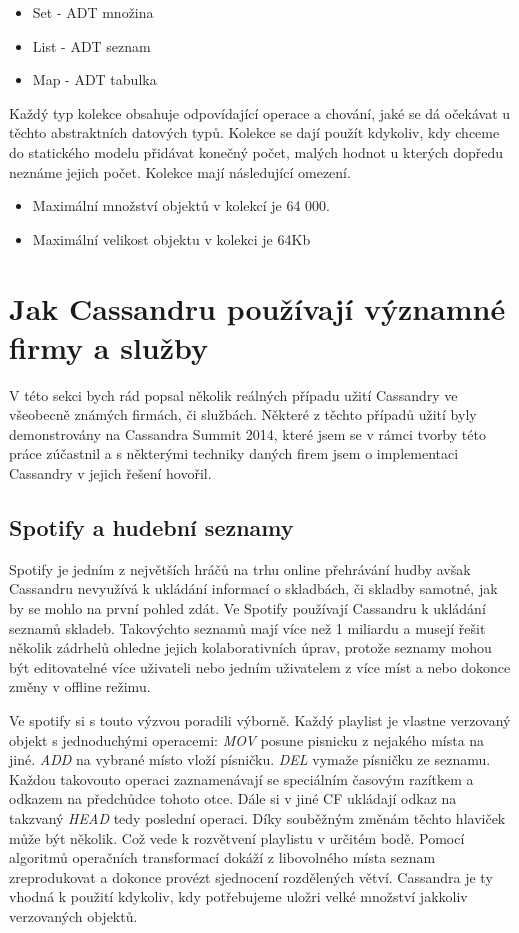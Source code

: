 \begin{itemize}
\item Set - ADT množina
\item List - ADT seznam
\item Map - ADT tabulka
\end{itemize}

Každý typ kolekce obsahuje odpovídající operace a  chování, jaké se dá očekávat u těchto abstraktních datových typů. Kolekce se dají použít kdykoliv, kdy chceme do statického modelu přidávat konečný počet, malých hodnot u kterých dopředu neznáme jejich počet. Kolekce mají následující omezení. 

\begin{itemize}
\item Maximální množství objektů v kolekcí je 64 000.
\item Maximální velikost objektu v kolekci je 64Kb
\end{itemize}

\section{Jak Cassandru používají významné firmy a služby}

V této sekci bych rád popsal několik reálných případu užití Cassandry ve všeobecně známých firmách, či službách. Některé z těchto případů užití byly demonstrovány na Cassandra Summit 2014, které jsem se v rámci tvorby této práce zúčastnil a s některými techniky daných firem jsem o implementaci Cassandry v jejich řešení hovořil. 

\subsection{Spotify a hudební seznamy}
Spotify je jedním z největších hráčů na trhu online přehrávání hudby avšak Cassandru nevyužívá k ukládání informací o skladbách, či skladby samotné, jak by se mohlo na první pohled zdát. Ve Spotify používají Cassandru k ukládání seznamů skladeb. Takovýchto seznamů mají více než 1 miliardu a musejí řešit několik zádrhelů ohledne jejich kolaborativních úprav, protože seznamy mohou být editovatelné více uživateli nebo jedním uživatelem z více míst a nebo dokonce změny v offline režimu. 

Ve spotify si s touto výzvou poradili výborně. Každý playlist je vlastne verzovaný objekt s jednoduchými operacemi: \emph{MOV} posune pisnicku z nejakého místa na jiné. \emph{ADD} na vybrané místo vloží písničku. \emph{DEL} vymaže písničku ze seznamu. Každou takovouto operaci zaznamenávají se speciálním časovým razítkem a odkazem na předchůdce tohoto otce. Dále si v jiné CF ukládají odkaz na takzvaný \emph{HEAD} tedy poslední operaci. Díky souběžným změnám těchto hlaviček může být několik. Což vede k rozvětvení playlistu v určitém bodě. Pomocí algoritmů operačních transformací dokáží z libovolného místa seznam zreprodukovat a dokonce provézt sjednocení rozdělených větví. Cassandra je ty vhodná k použití kdykoliv, kdy potřebujeme uložri velké množství jakkoliv verzovaných objektů. 

